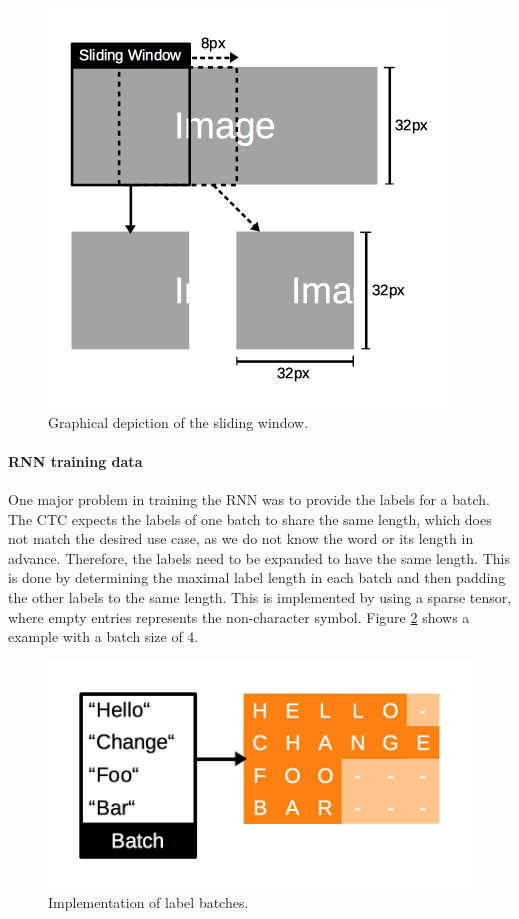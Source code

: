\documentclass{utue} %
\begin{document}
\begin{figure}[h!]
	\centering
	\includegraphics[width=\columnwidth]{graphics/model_sliding_window.png}
	\caption{\label{fig:sliding_window} Graphical depiction of the sliding window.}
\end{figure}


\paragraph{RNN training data}
One major problem in training the RNN was to provide the labels for a batch. The CTC expects the labels of one batch to share the same length, which does not match the desired use case, as we do not know the word or its length in advance. Therefore, the labels need to be expanded to have the same length. This is done by determining the maximal label length in each batch and then padding the other labels to the same length. This is implemented by using a sparse tensor, where empty entries represents the non-character symbol. Figure \ref{fig:impl_rnn_labels} shows a example with a batch size of 4.

\begin{figure}[h!]
	\centering
	\includegraphics[width=.9\columnwidth]{graphics/impl_rnn_labels.png}
	\caption{\label{fig:impl_rnn_labels} Implementation of label batches.}
\end{figure}
\end{document}
